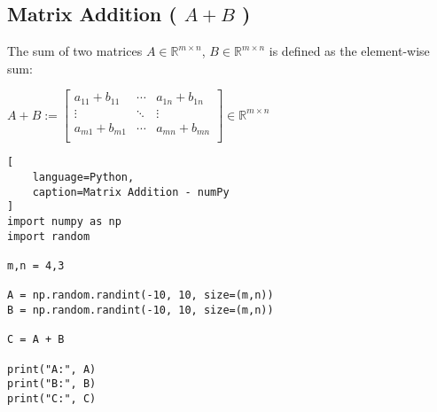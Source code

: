 \subsection{Matrix Addition ( $A+B$ ) \cite{mfml/book/mml/Deisenroth-Faisal-Ong}}

The sum of two matrices $A \in \mathbb{R}^{m\times n}$, $B \in \mathbb{R}^{m\times n}$ is defined as the element-wise sum:
\ \\

\hfill
\begin{customArrayStretch}{2}
$
    A + B
    := \begin{bmatrix}
        a_{11} + b_{11} &   \cdots  &  a_{1n} + b_{1n} \\
        \vdots          &   \ddots  &   \vdots  \\
        a_{m1} + b_{m1} &   \cdots  &  a_{mn} + b_{mn} \\
    \end{bmatrix}
    \in \mathbb{R}^{m\times n}
$
\end{customArrayStretch}
\hfill \cite{mfml/book/mml/Deisenroth-Faisal-Ong}

\begin{lstlisting}[
    language=Python,
    caption=Matrix Addition - numPy
]
import numpy as np
import random

m,n = 4,3

A = np.random.randint(-10, 10, size=(m,n))
B = np.random.randint(-10, 10, size=(m,n))

C = A + B

print("A:", A)
print("B:", B)
print("C:", C)
\end{lstlisting}



